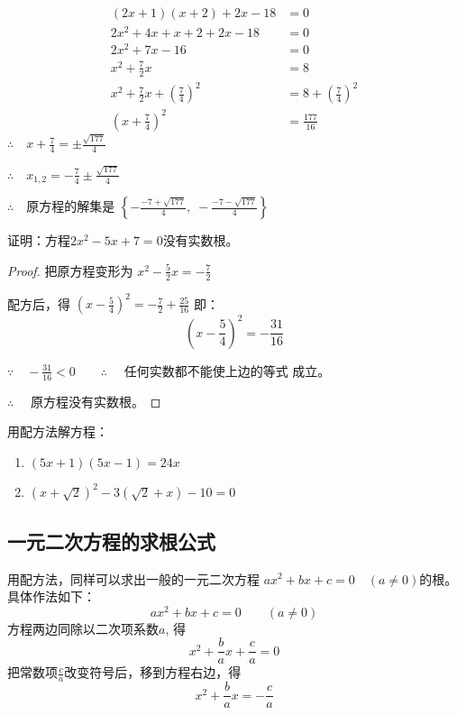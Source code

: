 \begin{solution}
\begin{align*}
    (2x+1)(x+2)+2x-18&=0\\
    2x^2+4x+x+2+2x-18&=0  \tag{去括号}\\
    2x^2+7x-16&=0  \tag{合并}\\
x^2+\frac{7}{2}x&=8  \tag{两边除以2}\\
x^2+\frac{7}{2}x+\left(\frac{7}{4}\right)^2&=8+\left(\frac{7}{4}\right)^2 \tag{配方}\\
\left(x+\frac{7}{4}\right)^2&=\frac{177}{16}
\end{align*}    
$\therefore\quad x+\frac{7}{4}=\pm\frac{\sqrt{177}}{4}$

$\therefore\quad x_{1,2}=-\frac{7}{4}\pm\frac{\sqrt{177}}{4}$

$\therefore\quad $原方程的解集是 $\left\{-\frac{-7+\sqrt{177}}{4},\; -\frac{-7-\sqrt{177}}{4}\right\}$
\end{solution}




\begin{example}
    证明：方程$2x^2-5x+7=0$没有实数根。
\end{example}

\begin{proof}
    把原方程变形为
    $x^2-\frac{5}{2}x=-\frac{7}{2}$

    配方后，得
    $\left(x-\frac{5}{4}\right)^2=-\frac{7}{2}+\frac{25}{16}$
    即：
    \[\left(x-\frac{5}{4}\right)^2=-\frac{31}{16} \]
    
    $\because\quad -\frac{31}{16}<0 \qquad \therefore\quad $
    任何实数都不能使上边的等式
    成立。
    
    $ \therefore\quad $ 原方程没有实数根。
\end{proof}

\begin{ex}
    用配方法解方程：
    \begin{enumerate}
        \item $(5x+1)(5x-1)=24x$
        \item $(x+\sqrt{2})^2-3(\sqrt{2}+x)-10=0$
    \end{enumerate}
\end{ex}

\subsection{一元二次方程的求根公式}
用配方法，同样可以求出一般的一元二次方程
$ax^2+bx+c=0\quad (a\ne 0)$的根。具体作法如下：
$$ax^2+bx+c=0\qquad (a\ne 0)$$
方程两边同除以二次项系数$a$, 得
$$x^2+\frac{b}{a}x+\frac{c}{a}=0$$
把常数项$\frac{c}{a}$改变符号后，移到方程右边，得
\[x^2+\frac{b}{a}x=-\frac{c}{a}\]

